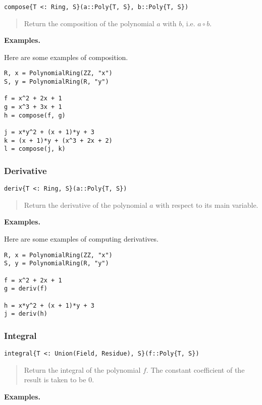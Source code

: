\documentclass[a4paper,10pt]{article}
\newcommand{\desc}[1]{\vspace{-3mm}\begin{quote}#1\end{quote}}
\begin{document}
{{\begin{lstlisting}
compose{T <: Ring, S}(a::Poly{T, S}, b::Poly{T, S})
\end{lstlisting}

\desc{Return the composition of the polynomial $a$ with $b$, i.e. $a \circ b$.}

\textbf{Examples.}

Here are some examples of composition.

\begin{lstlisting}
R, x = PolynomialRing(ZZ, "x")
S, y = PolynomialRing(R, "y")

f = x^2 + 2x + 1
g = x^3 + 3x + 1
h = compose(f, g)

j = x*y^2 + (x + 1)*y + 3
k = (x + 1)*y + (x^3 + 2x + 2)
l = compose(j, k)
\end{lstlisting}

\subsubsection{Derivative}

\begin{lstlisting}
deriv{T <: Ring, S}(a::Poly{T, S})
\end{lstlisting}

\desc{Return the derivative of the polynomial $a$ with respect to its main
variable.}

\textbf{Examples.}

Here are some examples of computing derivatives.

\begin{lstlisting}
R, x = PolynomialRing(ZZ, "x")
S, y = PolynomialRing(R, "y")

f = x^2 + 2x + 1
g = deriv(f)

h = x*y^2 + (x + 1)*y + 3
j = deriv(h)
\end{lstlisting}

\subsubsection{Integral}

\begin{lstlisting}
integral{T <: Union(Field, Residue), S}(f::Poly{T, S})
\end{lstlisting}

\desc{Return the integral of the polynomial $f$. The constant coefficient of
the result is taken to be $0$.}

\textbf{Examples.}

}}
\end{document}

